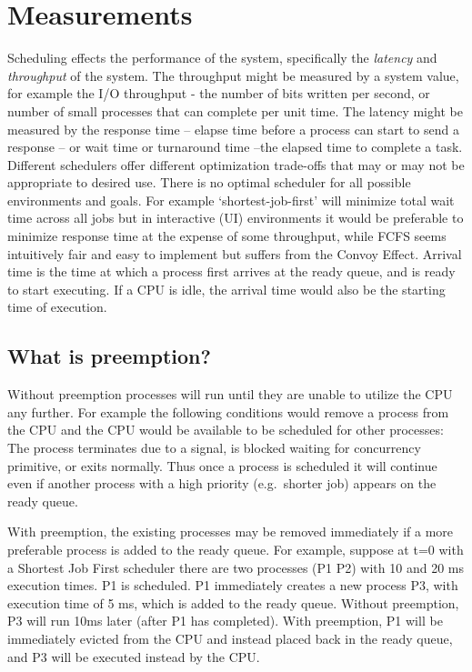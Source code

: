 \section{Measurements}

Scheduling effects the performance of the system, specifically the \emph{latency} and \emph{throughput} of the system. The throughput might be measured by a system value, for example the I/O throughput - the number of bits written per second, or number of small processes that can complete per unit time. The latency might be measured by the response time -- elapse time before a process can start to send a response -- or wait time or turnaround time --the elapsed time to complete a task. Different schedulers offer different optimization trade-offs that may or may not be appropriate to desired use. There is no optimal scheduler for all possible environments and goals. For example `shortest-job-first' will minimize total wait time across all jobs but in interactive (UI) environments it would be preferable to minimize response time at the expense of some throughput, while FCFS seems intuitively fair and easy to implement but suffers from the Convoy Effect. Arrival time is the time at which a process first arrives at the ready queue, and is ready to start executing. If a CPU is idle, the arrival time would also be the starting time of execution.

\subsection{What is preemption?}

Without preemption processes will run until they are unable to utilize the CPU any further. For example the following conditions would remove a process from the CPU and the CPU would be available to be scheduled for other processes: The process terminates due to a signal, is blocked waiting for concurrency primitive, or exits normally. Thus once a process is scheduled it will continue even if another process with a high priority (e.g.~shorter job) appears on the ready queue.

With preemption, the existing processes may be removed immediately if a more preferable process is added to the ready queue. For example, suppose at t=0 with a Shortest Job First scheduler there are two processes (P1 P2) with 10 and 20 ms execution times. P1 is scheduled. P1 immediately creates a new process P3, with execution time of 5 ms, which is added to the ready queue. Without preemption, P3 will run 10ms later (after P1 has completed). With preemption, P1 will be immediately evicted from the CPU and instead placed back in the ready queue, and P3 will be executed instead by the CPU.

